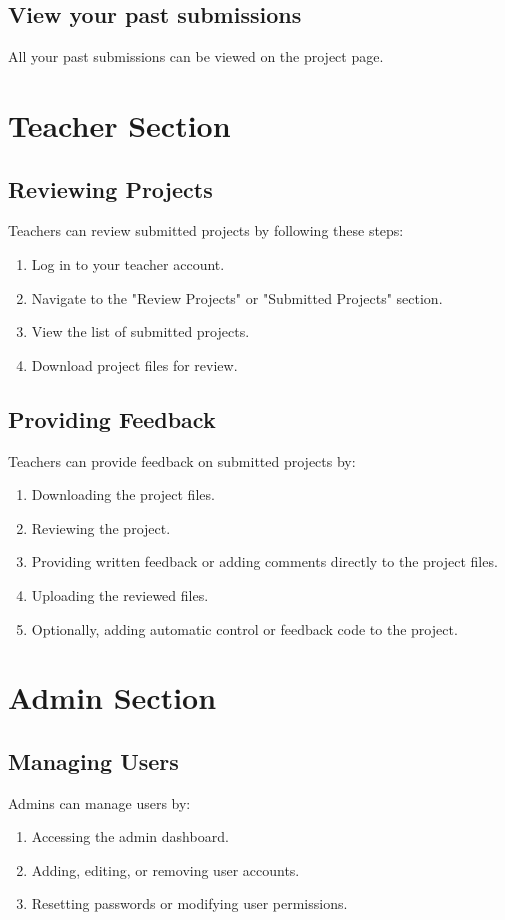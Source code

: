 \documentclass{article}
\begin{document}
\subsection{View your past submissions}
All your past submissions can be viewed on the project page.

\section{Teacher Section}
\subsection{Reviewing Projects}
Teachers can review submitted projects by following these steps:
\begin{enumerate}
    \item Log in to your teacher account.
    \item Navigate to the "Review Projects" or "Submitted Projects" section.
    \item View the list of submitted projects.
    \item Download project files for review.
\end{enumerate}

\subsection{Providing Feedback}
Teachers can provide feedback on submitted projects by:
\begin{enumerate}
    \item Downloading the project files.
    \item Reviewing the project.
    \item Providing written feedback or adding comments directly to the project files.
    \item Uploading the reviewed files.
    \item Optionally, adding automatic control or feedback code to the project.
\end{enumerate}

\section{Admin Section}
\subsection{Managing Users}
Admins can manage users by:
\begin{enumerate}
    \item Accessing the admin dashboard.
    \item Adding, editing, or removing user accounts.
    \item Resetting passwords or modifying user permissions.
\end{enumerate}
\end{document}
